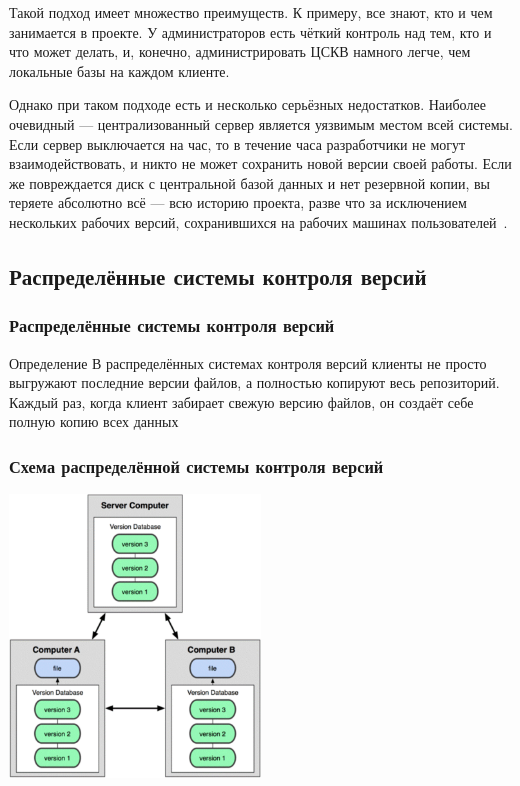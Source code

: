 \documentclass{../industrial-development}
\begin{document}
\lecturenotes

Такой подход имеет множество преимуществ. К примеру, все знают, кто и чем занимается в проекте. У администраторов есть чёткий контроль над тем, кто и что может делать, и, конечно, администрировать ЦСКВ намного легче, чем локальные базы на каждом клиенте.

Однако при таком подходе есть и несколько серьёзных недостатков. Наиболее очевидный — централизованный сервер является уязвимым местом всей системы. Если сервер выключается на час, то в течение часа разработчики не могут взаимодействовать, и никто не может сохранить новой версии своей работы. Если же повреждается диск с центральной базой данных и нет резервной копии, вы теряете абсолютно всё — всю историю проекта, разве что за исключением нескольких рабочих версий, сохранившихся на рабочих машинах пользователей~\cite[с.~6--7]{ProGit}.

\subsection{Распределённые системы контроля версий}

\begin{frame} \frametitle{Распределённые системы контроля версий}
  \begin{block}{Определение}
    В \alert{распределённых системах контроля версий} клиенты не просто выгружают последние версии файлов, а полностью копируют весь репозиторий. Каждый раз, когда клиент забирает свежую версию файлов, он создаёт себе полную копию всех данных
  \end{block}
 
\end{frame}

\begin{frame} \frametitle{Схема распределённой системы контроля версий}
  \centerline{\includegraphics[width=0.5\textwidth]{distributedVCS.pdf}}
\end{frame}
\end{document}
